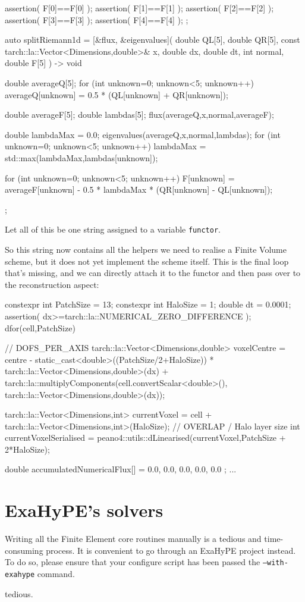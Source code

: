 \begin{code}
{  assertion( F[0]==F[0] );
  assertion( F[1]==F[1] );
  assertion( F[2]==F[2] );
  assertion( F[3]==F[3] );
  assertion( F[4]==F[4] );
};

auto splitRiemann1d = [&flux, &eigenvalues](
  double QL[5], double QR[5], const tarch::la::Vector<Dimensions,double>& x,
  double dx, double dt, int normal, double F[5]
) -> void { double averageQ[5]; 
  for (int unknown=0; unknown<5; unknown++) {
    averageQ[unknown] = 0.5 * (QL[unknown] + QR[unknown]);    
  }
    
  double averageF[5];
  double lambdas[5];
  flux(averageQ,x,normal,averageF);
  
  double lambdaMax = 0.0;
  eigenvalues(averageQ,x,normal,lambdas);
  for (int unknown=0; unknown<5; unknown++) {
    lambdaMax = std::max(lambdaMax,lambdas[unknown]);
  }
  
  for (int unknown=0; unknown<5; unknown++) {
    F[unknown] = averageF[unknown] - 0.5 * lambdaMax * (QR[unknown] - QL[unknown]);
  }
};  
\end{code}

\noindent
Let all of this be one string assigned to a variable \texttt{functor}.


So this string now contains all the helpers we need to realise a Finite Volume
scheme, but it does not yet implement the scheme itself.
This is the final loop that's missing, and we can directly attach it to the
functor and then pass over to the reconstruction aspect:

\begin{code}
  constexpr int PatchSize = 13;
  constexpr int HaloSize  = 1;    
  double dt = 0.0001;
  assertion( dx>=tarch::la::NUMERICAL_ZERO_DIFFERENCE );
  dfor(cell,PatchSize) { // DOFS_PER_AXIS
    tarch::la::Vector<Dimensions,double> voxelCentre = centre 
                                           - static_cast<double>((PatchSize/2+HaloSize)) * tarch::la::Vector<Dimensions,double>(dx)
                                           + tarch::la::multiplyComponents(cell.convertScalar<double>(), tarch::la::Vector<Dimensions,double>(dx));
    
    tarch::la::Vector<Dimensions,int> currentVoxel = cell + tarch::la::Vector<Dimensions,int>(HaloSize); // OVERLAP / Halo layer size
    int currentVoxelSerialised = peano4::utils::dLinearised(currentVoxel,PatchSize + 2*HaloSize);
    
    double accumulatedNumericalFlux[] = { 0.0, 0.0, 0.0, 0.0, 0.0 };
  ...
  }
\end{code}



\section{ExaHyPE's solvers}

Writing all the Finite Element core routines manually is a tedious and
time-consuming process.
It is convenient to go through an ExaHyPE project instead.
To do so, please ensure that your configure script has been passed the
\texttt{--with-exahype} command.


tedious.


% 
